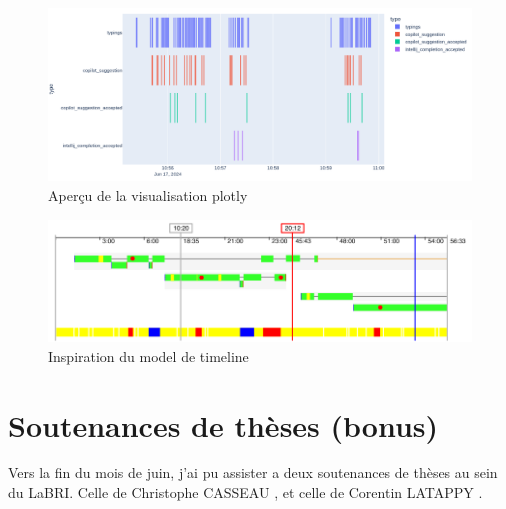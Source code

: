 \begin{figure}
  \centering
  \includegraphics[width=15cm]{images/cool-plot.png}
  \caption{Aperçu de la visualisation plotly}
  \label{cool-plot}
\end{figure}

\begin{figure}
  \centering
  \includegraphics[width=15cm]{images/ref-timeline.png}
  \caption{Inspiration du model de timeline \cite{cool-plot}}
  \label{ref-timeline}
\end{figure}


\newpage
\section{Soutenances de thèses (bonus)}

Vers la fin du mois de juin, j'ai pu assister a deux soutenances de thèses au sein du LaBRI.
Celle de Christophe CASSEAU \cite{these-casseau}, et celle de Corentin LATAPPY \cite{these-latappy}.
